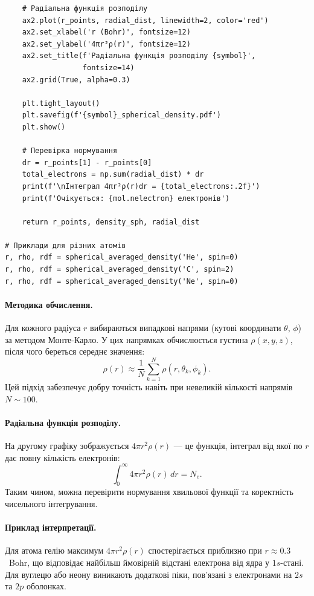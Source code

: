 \begin{verbatim}
    # Радіальна функція розподілу
    ax2.plot(r_points, radial_dist, linewidth=2, color='red')
    ax2.set_xlabel('r (Bohr)', fontsize=12)
    ax2.set_ylabel('4πr²ρ(r)', fontsize=12)
    ax2.set_title(f'Радіальна функція розподілу {symbol}',
                  fontsize=14)
    ax2.grid(True, alpha=0.3)

    plt.tight_layout()
    plt.savefig(f'{symbol}_spherical_density.pdf')
    plt.show()

    # Перевірка нормування
    dr = r_points[1] - r_points[0]
    total_electrons = np.sum(radial_dist) * dr
    print(f'\nІнтеграл 4πr²ρ(r)dr = {total_electrons:.2f}')
    print(f'Очікується: {mol.nelectron} електронів')

    return r_points, density_sph, radial_dist

# Приклади для різних атомів
r, rho, rdf = spherical_averaged_density('He', spin=0)
r, rho, rdf = spherical_averaged_density('C', spin=2)
r, rho, rdf = spherical_averaged_density('Ne', spin=0)
\end{verbatim}


\paragraph{Методика обчислення.}
Для кожного радіуса $r$ вибираються випадкові напрями (кутові координати $\theta$, $\phi$) за методом Монте-Карло.
У цих напрямках обчислюється густина $\rho(x,y,z)$, після чого береться середнє значення:
\[
    \rho(r) \approx \frac{1}{N} \sum_{k=1}^{N} \rho(r,\theta_k,\phi_k).
\]
Цей підхід забезпечує добру точність навіть при невеликій кількості напрямів $N \sim 100$.

\paragraph{Радіальна функція розподілу.}
На другому графіку зображується $4\pi r^2\rho(r)$ --- це функція, інтеграл від якої по $r$ дає повну кількість електронів:
\[
    \int_0^\infty 4\pi r^2\rho(r)\,dr = N_e.
\]
Таким чином, можна перевірити нормування хвильової функції та коректність чисельного інтегрування.

\paragraph{Приклад інтерпретації.}
Для атома гелію максимум $4\pi r^2\rho(r)$ спостерігається приблизно при $r \approx 0.3$~Bohr,
що відповідає найбільш ймовірній відстані електрона від ядра у $1s$-стані.
Для вуглецю або неону виникають додаткові піки, пов’язані з електронами на $2s$ та $2p$ оболонках.

